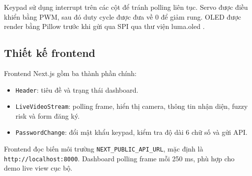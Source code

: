 Keypad sử dụng interrupt trên các cột để tránh polling liên tục. Servo được điều khiển bằng PWM, sau đó duty cycle được đưa về 0 để giảm rung. OLED được render bằng Pillow trước khi gửi qua SPI qua thư viện luma.oled \cite{lumaoled}.

\subsection{Thiết kế frontend}

Frontend Next.js gồm ba thành phần chính:

\begin{itemize}
    \item \texttt{Header}: tiêu đề và trạng thái dashboard.
    \item \texttt{LiveVideoStream}: polling frame, hiển thị camera, thông tin nhận diện, fuzzy risk và form đăng ký.
    \item \texttt{PasswordChange}: đổi mật khẩu keypad, kiểm tra độ dài 6 chữ số và gửi API.
\end{itemize}

Frontend đọc biến môi trường \texttt{NEXT\_PUBLIC\_API\_URL}, mặc định là \texttt{http://localhost:8000}. Dashboard polling frame mỗi 250 ms, phù hợp cho demo live view cục bộ.
